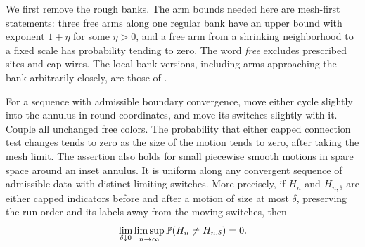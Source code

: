 We first remove the rough banks.  The arm bounds needed here are
mesh-first statements: three free arms along one regular bank have an
upper bound with exponent $1+\eta$ for some $\eta>0$, and a free arm from a
shrinking neighborhood to a fixed scale has probability tending to zero.
The word \emph{free} excludes prescribed sites and cap wires.  The local
bank versions, including arms approaching the bank arbitrarily closely,
are those of \cite[Section 2, ``Cardy tests in a boundary chart'' and
``Free boundary-arm bounds'']{V}.

\begin{lemma}\label{an:motion}
For a sequence with admissible boundary convergence, move either cycle
slightly into the annulus in round coordinates, and move its switches
slightly with it.  Couple all unchanged free colors.  The probability
that either capped connection test changes tends to zero as the size of
the motion tends to zero, after taking the mesh limit.  The assertion also
holds for small piecewise smooth motions in spare space around an inset
annulus.  It is uniform along any convergent sequence of admissible data
with distinct limiting switches.  More precisely, if $H_n$ and
$H_{n,\delta}$ are either capped indicators before and after a motion of
size at most $\delta$, preserving the run order and its labels away from
the moving switches, then
\begin{equation}\label{an:motion-limit}
 \lim_{\delta\downarrow0}\limsup_{n\to\infty}
 \mathbb P(H_n\ne H_{n,\delta})=0.
\end{equation}
\end{lemma}

